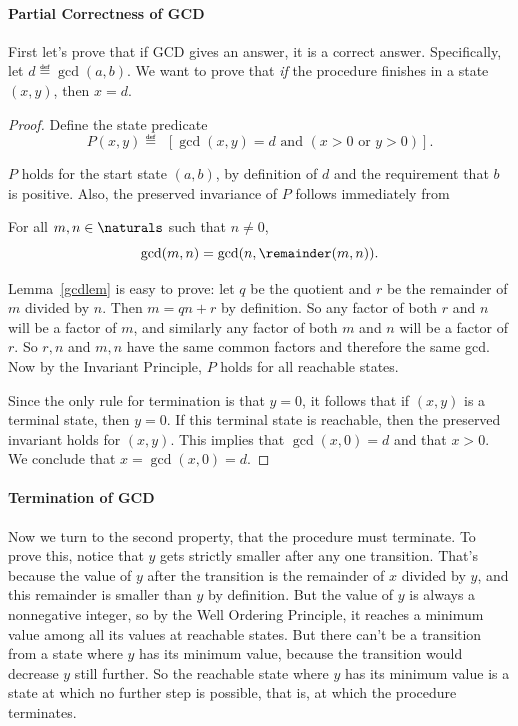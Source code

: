 \paragraph{Partial Correctness of GCD}

First let's prove that if GCD gives an answer, it is a correct answer.
Specifically, let $d \eqdef \gcd(a,b)$.  We want to prove that \emph{if}
the procedure finishes in a state $(x,y)$, then $x = d$.

\begin{proof}
Define the state predicate
\[
P(x,y) \eqdef\ \ [\gcd(x,y) = d \text{ and } (x > 0 \text{ or } y > 0)].
\]

$P$ holds for the start state $(a,b)$, by definition of $d$ and the
requirement that $b$ is positive.  Also, the preserved invariance of
$P$ follows immediately from
\begin{lemma}\label{gcdlem}
For all $m,n \in \naturals$ such that $n \neq 0$,
\begin{equation}
\gcd(m,n) = \gcd(n,\remainder(m,n)).
\end{equation}
\end{lemma}

Lemma~\ref{gcdlem} is easy to prove: let $q$ be the quotient and $r$
be the remainder of $m$ divided by $n$.  Then $m = qn +r$ by
definition.  So any factor of both $r$ and $n$ will be a factor of
$m$, and similarly any factor of both $m$ and $n$ will be a factor of
$r$.  So $r,n$ and $m,n$ have the same common factors and therefore
the same gcd.  Now by the Invariant Principle, $P$ holds for all
reachable states.

Since the only rule for termination is that $y=0$, it follows that if
$(x,y)$ is a terminal state, then $y=0$.  If this terminal state is
reachable, then the preserved invariant holds for $(x,y)$.  This implies
that $\gcd(x,0) = d$ and that $x>0$.  We conclude that $x = \gcd(x,0) =
d$.
\end{proof}

\paragraph{Termination of GCD}

Now we turn to the second property, that the procedure must terminate.  To
prove this, notice that $y$ gets strictly smaller after any one
transition.  That's because the value of $y$ after the transition is the
remainder of $x$ divided by $y$, and this remainder is smaller than $y$ by
definition.  But the value of $y$ is always a nonnegative integer, so by the
Well Ordering Principle, it reaches a minimum value among all its values
at reachable states.  But there can't be a transition from a state where
$y$ has its minimum value, because the transition would decrease $y$ still
further.  So the reachable state where $y$ has its minimum value is a
state at which no further step is possible, that is, at which the
procedure terminates.

